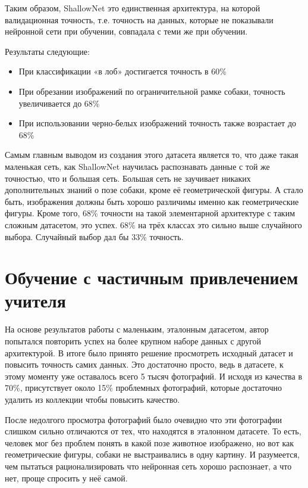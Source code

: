 Таким образом, ShallowNet это единственная архитектура, на которой валидационная точность, т.е. точность на данных, которые не показывали нейронной сети при обучении, совпадала с теми же при обучении.

Результаты следующие:
\begin{itemize}
    \item При классификации «в лоб» достигается точность в 60\%
    \item При обрезании изображений по ограничительной рамке собаки, точность увеличивается до 68\%
    \item При использовании черно-белых изображений точность также возрастает до 68\%
\end{itemize}

Самым главным выводом из создания этого датасета является то, что даже такая маленькая сеть, как ShallowNet научилась распознавать данные с той же точностью, что и большая сеть. Большая сеть не заучивает никаких дополнительных знаний о позе собаки, кроме её геометрической фигуры. А стало быть, изображения должны быть хорошо различимы именно как геометрические фигуры. Кроме того, 68\% точности на такой элементарной архитектуре с таким сложным датасетом, это успех. 68\% на трёх классах это сильно выше случайного выбора. Случайный выбор дал бы 33\% точность.

\section{Обучение с частичным привлечением учителя} \label{sect3_3}
На основе результатов работы с маленьким, эталонным датасетом, автор попытался повторить успех на более крупном наборе данных с другой архитектурой. В итоге было принято решение просмотреть исходный датасет и повысить точность самих данных. Это достаточно просто, ведь в датасете, к этому моменту уже оставалось всего 5 тысяч фотографий. И исходя из качества в 70\%, присутствует около 15\% проблемных фотографий, которые достаточно удалить из коллекции чтобы повысить качество.

После недолгого просмотра фотографий было очевидно что эти фотографии слишком сильно отличаются от тех, что находятся в эталонном датасете. То есть, человек мог без проблем понять в какой позе животное изображено, но вот как геометрические фигуры, собаки не выстраивались в одну картину. И разумеется, чем пытаться рационализировать что нейронная сеть хорошо распознает, а что нет, проще спросить у неё самой.

